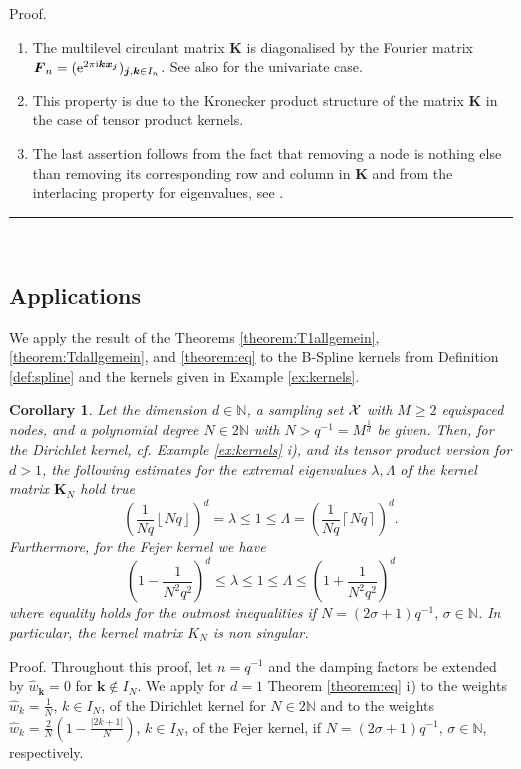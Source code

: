 \documentclass[11pt,a4paper,bibtotoc]{scrartcl}
\def\N{\mathbb{N}}
\def\ti{\mbox{\scriptsize{\rm i}}}
\newcommand{\eip}[1]{{\rm e}^{ 2\pi{\ti} #1}}
\newcommand{\zb}[1]{\ensuremath{\boldsymbol{#1}}}
\newcommand{\indexset}{{I_N}}
\renewcommand{\Box}{\hspace*{0ex} \hfill \rule{1.5ex}{1.5ex} \\ \goodbreak}
\newtheorem{corollary}[theorem]{Corollary}
\newenvironment{Corollary}{\goodbreak \begin{corollary}\rm}{\end{corollary}}
\numberwithin{equation}{section}
\numberwithin{table}{section}
\numberwithin{figure}{section}
\begin{document}
Proof.
\begin{enumerate}
\item The multilevel circulant matrix $\zb K$ is diagonalised by the Fourier
  matrix $\zb F_n=(\eip{\zb k\zb x_{\zb j}})_{\zb j,\zb k\in I_n}$.
  See also \cite[Cor. 3.10, Thm. 3.11]{NaSiWa98} for the univariate case.
\item This property is due to the Kronecker product structure of the matrix
  $\zb K$ in the case of tensor product kernels.
\item The last assertion follows from the fact that removing a node is nothing
  else than removing its corresponding row and column in $\zb K$ and from the
  interlacing property for eigenvalues, see \cite[pp. 185]{HoJo}.
\end{enumerate}
\Box

\subsection*{Applications} \label{sect:appl}
We apply the result of the Theorems \ref{theorem:T1allgemein},
\ref{theorem:Tdallgemein}, and \ref{theorem:eq} to the B-Spline kernels from
Definition \ref{def:spline} and the kernels given in Example
\ref{ex:kernels}.
\begin{Corollary}  \label{cor:eq}
  Let the dimension $d\in\N$, a sampling set $\cal X$ with $M\ge 2$ equispaced
  nodes, and a polynomial degree $N\in 2\mathbb{N}$ with
  $N>q^{-1}=M^{\frac{1}{d}}$ be given.
  Then, for the Dirichlet kernel, cf. Example \ref{ex:kernels} i),
  and its tensor product version for $d>1$, the following estimates for the
  extremal eigenvalues $\lambda,\Lambda$ of the kernel matrix $\zb K_N$ hold
  true
  \begin{equation*}
    \left(\frac{1}{Nq}\left\lfloor Nq \right\rfloor\right)^d
    = \lambda \le 1 \le \Lambda =
    \left(\frac{1}{Nq}\left\lceil{Nq}\right\rceil\right)^d.
  \end{equation*}
  Furthermore, for the Fejer kernel we have
  \begin{equation*}
    \left(1- \frac{1}{ N^2q^{2}}\right)^d
    \le \lambda \le 1 \le \Lambda \le
    \left(1+ \frac{1}{ N^2q^{2}}\right)^d
  \end{equation*}
  where equality holds for the outmost inequalities if
  $N=\left(2\sigma+1\right)q^{-1},\,\sigma\in\mathbb{N}$.
  In particular, the kernel matrix $K_N$ is non singular.
\end{Corollary}

Proof. Throughout this proof, let $n=q^{-1}$ and the damping factors be
extended by $\hat w_{\zb k}=0$ for $\zb k \notin \indexset$.
We apply for $d=1$ Theorem \ref{theorem:eq} i) to the weights
$\hat w_k= \frac{1}{N}$, $k \in I_N$, of the Dirichlet kernel for $N\in 2\N$
and to the weights $\hat w_k= \frac{2}{N}(1-\frac{|2k+1|}{N})$, $k \in I_N$,
of the Fejer kernel, if $N=\left(2\sigma+1\right)q^{-1},\,\sigma\in
\mathbb{N}$, respectively.
\end{document}
